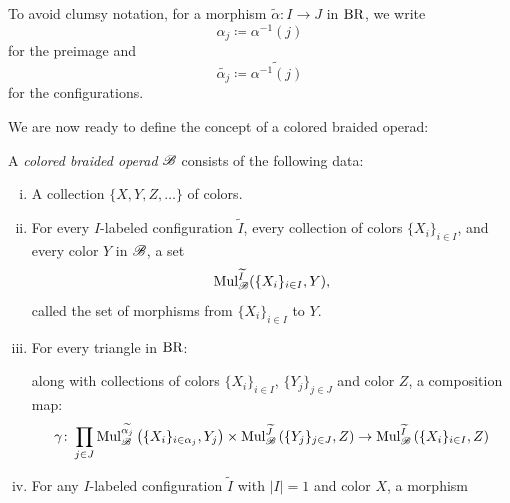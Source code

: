 \begin{nota}
    To avoid clumsy notation, for a morphism $\widetilde{\alpha} \colon I \to J$ in $\operatorname{BR}$, we write
    $$\alpha_j \coloneqq \alpha^{-1}(j)$$ 
    for the preimage and 
    $$\widetilde{\alpha_j} \coloneqq \widetilde{\alpha^{-1}(j)}$$
    for the configurations.
\end{nota}

    

We are now ready to define the concept of a colored braided operad:   

\begin{defin}\label{def:col-br-op} A {\em colored braided operad} $\mathscr{B}$ consists
    of the following data:
    \begin{enumerate}[(i)]
        \item A collection $\{X,Y,Z, \dots\}$ of colors.
        \item For every $I$-labeled configuration $\widetilde{I}$, every
        collection of colors $\{X_i\}_{i \in I}$, and every color $Y$ in $\mathscr{B}$, a
        set
        \[
            \operatorname{Mul}_{\mathscr{B}}^{\widetilde{I}}(\{X_i\}_{i \in I}, Y),
        \]
        called the set of morphisms from $\{X_i\}_{i \in I}$ to $Y$.
        \item For every triangle in $\operatorname{BR}$:




        
        \begin{center}
        \end{center}
        along with collections of colors $\{X_i\}_{i \in I}$, $\{Y_j\}_{j \in
        J}$ and color $Z$, a composition map:
        \[
            \gamma \colon \prod_{j \in J} \operatorname{Mul}_{\mathscr{B}}^{\widetilde{\alpha_j}}\left(\{X_i\}_{i \in \alpha_j}, Y_j\right) \times \operatorname{Mul}_{\mathscr{B}}^{\widetilde{J}}\left(\{Y_j\}_{j\in J}, Z\right) \to \operatorname{Mul}_{\mathscr{B}}^{\widetilde{I}}\left(\{X_i\}_{i \in I}, Z\right)  
        \]
        \item For any $I$-labeled configuration $\widetilde{I}$ with $|I|=1$ and
        color $X$, a morphism


\end{enumerate}
\end{defin}
